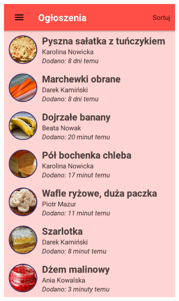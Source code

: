 \documentclass[licencjacka]{pracamgr}
\begin{document}
\newpage
\begin{figure}[H]
  \centering
  \begin{subfigure}[b]{0.4\linewidth}
    \begin{framed}
      \includegraphics[width=\linewidth]{lista.png}
    \end{framed}
  \end{subfigure}
  \caption{Lista dostępnych ogłoszeń.}
  \begin{subfigure}[b]{0.4\linewidth}
    \begin{framed}

\end{framed}
\end{subfigure}
\end{figure}
\end{document}
